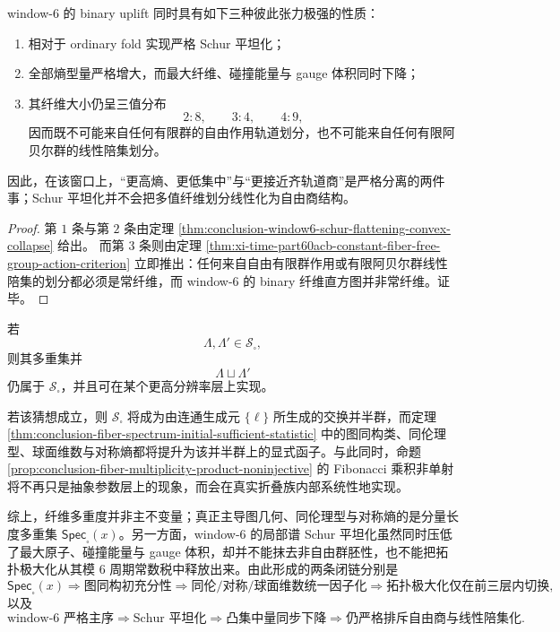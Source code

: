 \begin{corollary}\label{cor:conclusion-window6-schur-flattening-not-quotient}
window-\(6\) 的 binary uplift 同时具有如下三种彼此张力极强的性质：
\begin{enumerate}
\item 相对于 ordinary fold 实现严格 Schur 平坦化；
\item 全部熵型量严格增大，而最大纤维、碰撞能量与 gauge 体积同时下降；
\item 其纤维大小仍呈三值分布
\[
2:8,\qquad 3:4,\qquad 4:9,
\]
因而既不可能来自任何有限群的自由作用轨道划分，也不可能来自任何有限阿贝尔群的线性陪集划分。
\end{enumerate}
因此，在该窗口上，“更高熵、更低集中”与“更接近齐轨道商”是严格分离的两件事；Schur 平坦化并不会把多值纤维划分线性化为自由商结构。
\end{corollary}
\begin{proof}
第 \(1\) 条与第 \(2\) 条由定理 \ref{thm:conclusion-window6-schur-flattening-convex-collapse} 给出。
而第 \(3\) 条则由定理 \ref{thm:xi-time-part60acb-constant-fiber-free-group-action-criterion} 立即推出：任何来自自由有限群作用或有限阿贝尔群线性陪集的划分都必须是常纤维，而 window-\(6\) 的 binary 纤维直方图并非常纤维。证毕。
\end{proof}

\begin{conjecture}[可实现纤维谱的并半群闭包]\label{conj:conclusion-realizable-fiber-spectrum-semigroup-closure}
若
\[
\Lambda,\Lambda'\in \mathscr S_{\square},
\]
则其多重集并
\[
\Lambda\sqcup \Lambda'
\]
仍属于 \(\mathscr S_{\square}\)，并且可在某个更高分辨率层上实现。
\end{conjecture}

\noindent
若该猜想成立，则 \(\mathscr S_{\square}\) 将成为由连通生成元 \(\{\ell\}\) 所生成的交换并半群，而定理 \ref{thm:conclusion-fiber-spectrum-initial-sufficient-statistic} 中的图同构类、同伦理型、球面维数与对称熵都将提升为该并半群上的显式函子。与此同时，命题 \ref{prop:conclusion-fiber-multiplicity-product-noninjective} 的 Fibonacci 乘积非单射将不再只是抽象参数层上的现象，而会在真实折叠族内部系统性地实现。

\noindent
综上，纤维多重度并非主不变量；真正主导图几何、同伦理型与对称熵的是分量长度多重集 \(\mathsf{Spec}_{\square}(x)\)。另一方面，window-\(6\) 的局部谱 Schur 平坦化虽然同时压低了最大原子、碰撞能量与 gauge 体积，却并不能抹去非自由群胚性，也不能把拓扑极大化从其模 \(6\) 周期常数税中释放出来。由此形成的两条闭链分别是
\[
\mathsf{Spec}_{\square}(x)
\Longrightarrow
\text{图同构初充分性}
\Longrightarrow
\text{同伦/对称/球面维数统一因子化}
\Longrightarrow
\text{拓扑极大化仅在前三层内切换},
\]
以及
\[
\text{window-}6\text{ 严格主序}
\Longrightarrow
\text{Schur 平坦化}
\Longrightarrow
\text{凸集中量同步下降}
\Longrightarrow
\text{仍严格排斥自由商与线性陪集化}.
\]

\endinput
